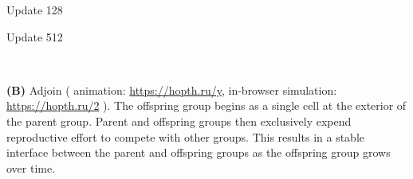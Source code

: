 \begin{figure*}[!htbp]
\begin{center}
\begin{minipage}[b]{\textwidth}
\begin{minipage}[t]{0.18\textwidth}
{\footnotesize Update 128}
\end{minipage}
\begin{minipage}[t]{0.18\textwidth}
\centering
{}
{\footnotesize Update 512}
\end{minipage}\\
\begin{minipage}{\textwidth}
\dissertationonly{\footnotesize}
\textbf{(B)} Adjoin
(%
animation: \url{https://hopth.ru/y},
in-browser simulation: \url{https://hopth.ru/2}%
).
The offspring group begins as a single cell at the exterior of the parent group.
Parent and offspring groups then exclusively expend reproductive effort to compete with other groups.
This results in a stable interface between the parent and offspring groups as the offspring group grows over time.
\end{minipage}
\end{minipage}

\vspace{3ex}


\end{center}
\end{figure*}
